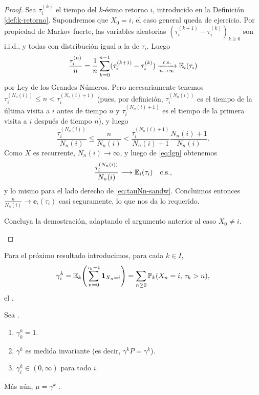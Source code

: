 \begin{proof}
Sea $\tau^{(k)}_i$ el tiempo del $k$-ésimo retorno $i$, introducido en la Definición \ref{def:k-retorno}.
Supondremos que $X_0=i$, el caso general queda de ejercicio.
Por propiedad de Markov fuerte, las variables aleatorias $(\tau^{(k+1)}_i-\tau^{(k)}_i)_{k\geq0}$ son i.i.d., y todas con distribución igual a la de $\tau_i$.
Luego
\begin{equation}
\frac{\tau^{(n)}_i}{n}=\frac1{n}\sum_{k=0}^{n-1}(\tau^{(k+1)}_i-\tau^{(k)}_i)
\xrightarrow[n\to\infty]{\text{\upshape{c.s.}}}\mathbb{E}_i(\tau_i)\label{eq:lgn}
\end{equation}
por Ley de los Grandes Números.
Pero necesariamente tenemos $\tau^{(N_n(i))}_i\leq n<\tau^{(N_n(i)+1)}_i$ (pues, por definición, $\tau^{(N_n(i))}_i$ es el tiempo de la última visita a $i$ antes de tiempo $n$ y $\tau^{(N_n(i)+1)}_i$ es el tiempo de la primera visita a $i$ después de tiempo $n$), y luego
\begin{equation}
\frac{\tau^{(N_n(i))}_i}{N_n(i)}\leq\frac{n}{N_n(i)}<\frac{\tau^{(N_n(i)+1)}_i}{N_n(i)+1}\frac{N_n(i)+1}{N_n(i)}.\label{eq:tauNn-sandw}
\end{equation}
Como $X$ es recurrente, $N_n(i)\to\infty$, y luego de \eqref{eq:lgn} obtenemos 
\[\frac{\tau_i^{(N_n(i))}}{N_n(i)}\longrightarrow\mathbb{E}_i(\tau_i)\quad\text{\upshape{c.s.}},\]
y lo mismo para el lado derecho de \eqref{eq:tauNn-sandw}.
Concluimos entonces $\frac{n}{N_n(i)}\longrightarrow\ee_i(\tau_i)$ casi seguramente, lo que nos da lo requerido.

\begin{exer}
Concluya la demostración, adaptando el argumento anterior al caso $X_0\neq i$.\qedhere
\end{exer}
\end{proof}

Para el próximo resultado introducimos, para cada $k\in I$,
\[\gamma_i^k=\mathbb{E}_k\!\left(\sum_{n=0}^{\tau_k-1}\mathbf{1}_{X_n=i}\right)=\sum_{n\geq0}\mathbb{P}_k(X_n=i,\,\tau_k>n),\]
el .

\begin{prop}\label{prop:gammaik}
Sea .
\begin{enumerate}[label=\uptext{(\alph*)}]
\item $\gamma^k_k=1$.
\item $\gamma^k$ es medida invariante (es decir, $\gamma^kP=\gamma^k$).
\item $\gamma^k_i\in(0,\infty)$ para todo $i$.
\end{enumerate}
Más aún, $\mu=\gamma^k$ .
\end{prop}

